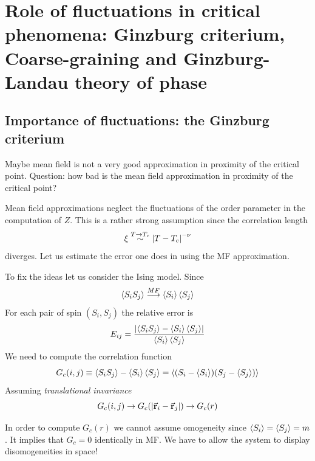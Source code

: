 \documentclass[../main/main.tex]{subfiles}
\begin{document}
\chapter{Role of fluctuations in critical phenomena: Ginzburg criterium, Coarse-graining and Ginzburg-Landau theory of phase}

\section{Importance of fluctuations: the Ginzburg criterium}
Maybe mean field is not a very good approximation in proximity of the critical point. Question: how bad is the mean field approximation in proximity of the critical point?

Mean field approximations neglect the fluctuations of the order parameter in the computation of \( Z \).
This is a rather strong assumption since the correlation length
\begin{equation}
   \xi \overset{T \rightarrow T_c}{\sim } \abs{T-T_c}^{-\nu }
\end{equation}
diverges. Let us estimate the error one does in using the MF approximation.

To fix the ideas let us consider the Ising model. Since
\begin{equation}
  \expval{S_i S_j} \overset{MF}{\longrightarrow } \expval{S_i} \expval{S_j}
\end{equation}
For each pair of spin \( (S_i,S_j) \) the relative error is
\begin{equation}
  E_{ij} = \frac{ \abs{\expval{S_i S_j}  - \expval{S_i} \expval{S_j}}   }{\expval{S_i}\expval{S_j}  }
\end{equation}
We need to compute the correlation function
\begin{equation}
  G_c (i,j) \equiv \expval{S_i S_j} - \expval{S_i} \expval{S_j} = \expval{(S_i -\expval{S_i} )(S_j - \expval{S_j} )}
\end{equation}
Assuming \emph{translational invariance}
\begin{equation}
  G_c (i,j) \rightarrow G_c \qty(\abs{\va{r}_i - \va{r}_j} ) \rightarrow G_c (r)
\end{equation}
\begin{remark}
In order to compute \( G_c (r) \) we cannot assume omogeneity since \( \expval{S_i} = \expval{S_j} = m   \). It implies that \( G_c = 0 \) identically in MF. We have to allow the system to display disomogeneities in space!
\end{remark}
\end{document}

